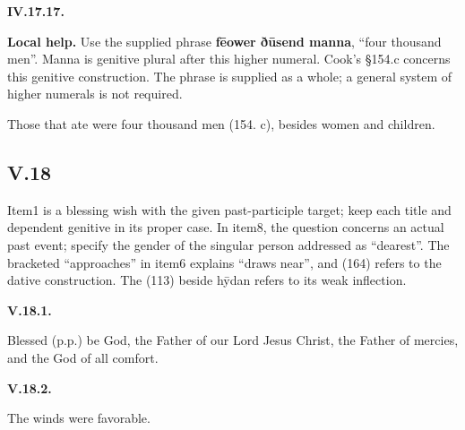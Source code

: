 \par\begin{minipage}{\linewidth}\raggedright
\textbf{IV.17.17.}

\textbf{Local help.} Use the supplied phrase \textbf{fēower ðūsend manna}, “four thousand men”. Manna is genitive plural after this higher numeral. Cook’s §154.c concerns this genitive construction. The phrase is supplied as a whole; a general system of higher numerals is not required.

Those that ate were four thousand men (154. c), besides women and children.

\end{minipage}\par\addvspace{4pt}

\subsection*{V.18}

Item1 is a blessing wish with the given past-participle target; keep each title and dependent genitive in its proper case. In item8, the question concerns an actual past event; specify the gender of the singular person addressed as “dearest”. The bracketed “approaches” in item6 explains “draws near”, and (164) refers to the dative construction. The (113) beside hȳdan refers to its weak inflection.

\par\begin{minipage}{\linewidth}\raggedright
\textbf{V.18.1.}

Blessed (p.p.) be God, the Father of our Lord Jesus Christ, the Father of mercies, and the God of all comfort.

\end{minipage}\par\addvspace{4pt}

\par\begin{minipage}{\linewidth}\raggedright
\textbf{V.18.2.}

The winds were favorable.

\end{minipage}\par\addvspace{4pt}

